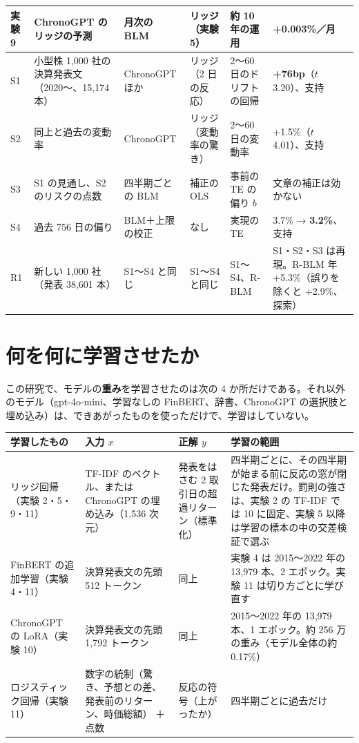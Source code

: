 \begin{small}
\begin{longtable}{P{1.2cm}P{3.3cm}P{2.2cm}P{2.2cm}P{2.2cm}P{2.5cm}}
実験 9 & ChronoGPT のリッジの予測 & 月次の BLM & リッジ（実験 5） & 約 10 年の運用 & +0.003\%／月 \\
\midrule
S1 & 小型株 1,000 社の決算発表文（2020〜、15,174 本） & ChronoGPT ほか & リッジ（2 日の反応） & 2〜60 日のドリフトの回帰 & \textbf{+76bp}（$t$ 3.20）、支持 \\
S2 & 同上と過去の変動率 & ChronoGPT & リッジ（変動率の驚き） & 2〜60 日の変動率 & +1.5\%（$t$ 4.01）、支持 \\
S3 & S1 の見通し、S2 のリスクの点数 & 四半期ごとの BLM & 補正の OLS & 事前の TE の偏り $b$ & 文章の補正は効かない \\
S4 & 過去 756 日の偏り & BLM＋上限の校正 & なし & 実現の TE & 3.7\% → \textbf{3.2\%}、支持 \\
R1 & 新しい 1,000 社（発表 38,601 本） & S1〜S4 と同じ & S1〜S4 と同じ & S1〜S4、R-BLM & S1・S2・S3 は再現。R-BLM 年 +5.3\%（誤りを除くと +2.9\%、探索） \\
\end{longtable}
\end{small}

\section{何を何に学習させたか}

この研究で、モデルの\textbf{重み}を学習させたのは次の 4 か所だけである。それ以外のモデル（gpt-4o-mini、学習なしの FinBERT、辞書、ChronoGPT の選択肢と埋め込み）は、できあがったものを使っただけで、学習はしていない。

\begin{longtable}{P{3.0cm}P{3.6cm}P{3.6cm}P{4.4cm}}
\toprule
\textbf{学習したもの} & \textbf{入力 $x$} & \textbf{正解 $y$} & \textbf{学習の範囲} \\
\midrule
\endhead
\bottomrule
\endfoot
リッジ回帰（実験 2・5・9・11） & TF-IDF のベクトル、または ChronoGPT の埋め込み（1,536 次元） & 発表をはさむ 2 取引日の超過リターン（標準化） & 四半期ごとに、その四半期が始まる前に反応の窓が閉じた発表だけ。罰則の強さは、実験 2 の TF-IDF では 10 に固定、実験 5 以降は学習の標本の中の交差検証で選ぶ \\
FinBERT の追加学習（実験 4・11） & 決算発表文の先頭 512 トークン & 同上 & 実験 4 は 2015〜2022 年の 13,979 本、2 エポック。実験 11 は切り方ごとに学び直す \\
ChronoGPT の LoRA（実験 10） & 決算発表文の先頭 1,792 トークン & 同上 & 2015〜2022 年の 13,979 本、1 エポック。約 256 万の重み（モデル全体の約 0.17\%） \\
ロジスティック回帰（実験 11） & 数字の統制（驚き、予想との差、発表前のリターン、時価総額） ＋ 点数 & 反応の符号（上がったか） & 四半期ごとに過去だけ \\
\end{longtable}

